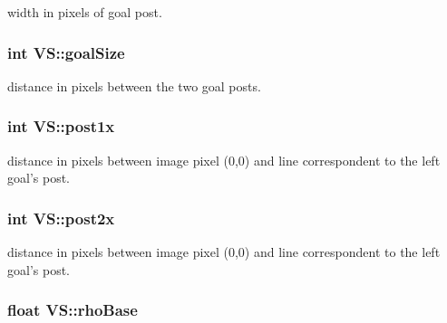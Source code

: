 width in pixels of goal post. 

\hypertarget{classVS_a45943631ac252202008ae6c6d4a7d96e}{
\subsubsection[{goal\-Size}]{\setlength{\rightskip}{0pt plus 5cm}int V\-S\-::goal\-Size\hspace{0.3cm}{\ttfamily [private]}}}\label{classVS_a45943631ac252202008ae6c6d4a7d96e}


distance in pixels between the two goal posts. 

\hypertarget{classVS_afcfda457424fbedf3ecce12147824b9f}{
\subsubsection[{post1x}]{\setlength{\rightskip}{0pt plus 5cm}int V\-S\-::post1x\hspace{0.3cm}{\ttfamily [private]}}}\label{classVS_afcfda457424fbedf3ecce12147824b9f}


distance in pixels between image pixel (0,0) and line correspondent to the left goal's post. 

\hypertarget{classVS_a63d3c7e65529d389989435d277f3dbe5}{
\subsubsection[{post2x}]{\setlength{\rightskip}{0pt plus 5cm}int V\-S\-::post2x\hspace{0.3cm}{\ttfamily [private]}}}\label{classVS_a63d3c7e65529d389989435d277f3dbe5}


distance in pixels between image pixel (0,0) and line correspondent to the left goal's post. 

\hypertarget{classVS_a53922209c67146633aa44c253ddcf511}{
\subsubsection[{rho\-Base}]{\setlength{\rightskip}{0pt plus 5cm}float V\-S\-::rho\-Base\hspace{0.3cm}{\ttfamily [private]}}}\label{classVS_a53922209c67146633aa44c253ddcf511}


